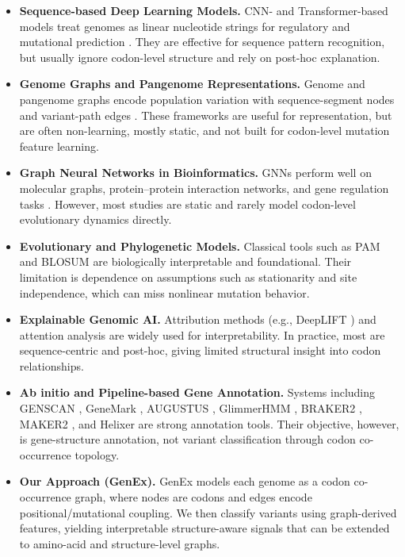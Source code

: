 \documentclass[conference]{IEEEtran}
\begin{document}
\begin{itemize}

\item \textbf{Sequence-based Deep Learning Models.} CNN- and Transformer-based models treat genomes as linear nucleotide strings for regulatory and mutational prediction \cite{zhou2015predicting, avsec2021effective}. They are effective for sequence pattern recognition, but usually ignore codon-level structure and rely on post-hoc explanation.

\item \textbf{Genome Graphs and Pangenome Representations.} Genome and pangenome graphs encode population variation with sequence-segment nodes and variant-path edges \cite{garrison2018variation}. These frameworks are useful for representation, but are often non-learning, mostly static, and not built for codon-level mutation feature learning.

\item \textbf{Graph Neural Networks in Bioinformatics.} GNNs perform well on molecular graphs, protein--protein interaction networks, and gene regulation tasks \cite{zitnik2018modeling, gilmer2017neural}. However, most studies are static and rarely model codon-level evolutionary dynamics directly.

\item \textbf{Evolutionary and Phylogenetic Models.} Classical tools such as PAM \cite{dayhoff1978atlas} and BLOSUM \cite{henikoff1992amino} are biologically interpretable and foundational. Their limitation is dependence on assumptions such as stationarity and site independence, which can miss nonlinear mutation behavior.

\item \textbf{Explainable Genomic AI.} Attribution methods (e.g., DeepLIFT \cite{shrikumar2017learning}) and attention analysis are widely used for interpretability. In practice, most are sequence-centric and post-hoc, giving limited structural insight into codon relationships.

\item \textbf{Ab initio and Pipeline-based Gene Annotation.} Systems including GENSCAN \cite{burge1997prediction}, GeneMark \cite{lomsadze2005gene}, AUGUSTUS \cite{stanke2008using}, GlimmerHMM \cite{majoros2004tigrscan}, BRAKER2 \cite{hoff2019whole}, MAKER2 \cite{holt2011maker}, and Helixer \cite{holst2023helixer} are strong annotation tools. Their objective, however, is gene-structure annotation, not variant classification through codon co-occurrence topology.

\item \textbf{Our Approach (GenEx).} GenEx models each genome as a codon co-occurrence graph, where nodes are codons and edges encode positional/mutational coupling. We then classify variants using graph-derived features, yielding interpretable structure-aware signals that can be extended to amino-acid and structure-level graphs.

\end{itemize}
\end{document}
